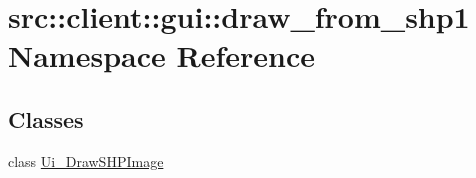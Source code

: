 \hypertarget{namespacesrc_1_1client_1_1gui_1_1draw__from__shp1}{
\section{src::client::gui::draw\_\-from\_\-shp1 Namespace Reference}
\label{namespacesrc_1_1client_1_1gui_1_1draw__from__shp1}
}
\subsection*{Classes}
\begin{DoxyCompactItemize}
\item 
class \hyperlink{classsrc_1_1client_1_1gui_1_1draw__from__shp1_1_1Ui__DrawSHPImage}{Ui\_\-DrawSHPImage}
\end{DoxyCompactItemize}
